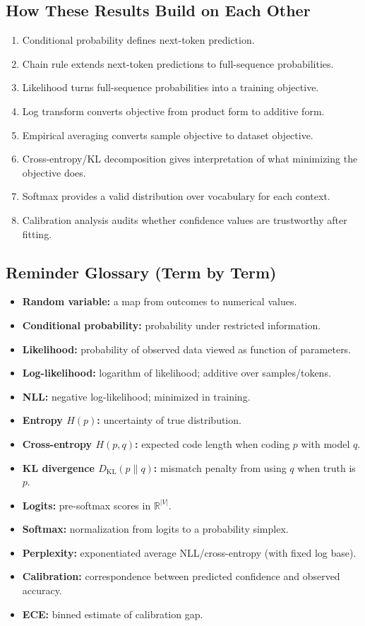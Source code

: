 \subsection*{How These Results Build on Each Other}
\begin{enumerate}[leftmargin=1.5em]
  \item Conditional probability defines next-token prediction.
  \item Chain rule extends next-token predictions to full-sequence probabilities.
  \item Likelihood turns full-sequence probabilities into a training objective.
  \item Log transform converts objective from product form to additive form.
  \item Empirical averaging converts sample objective to dataset objective.
  \item Cross-entropy/KL decomposition gives interpretation of what minimizing the objective does.
  \item Softmax provides a valid distribution over vocabulary for each context.
  \item Calibration analysis audits whether confidence values are trustworthy after fitting.
\end{enumerate}

\subsection*{Reminder Glossary (Term by Term)}
\begin{itemize}[leftmargin=1.5em]
  \item \textbf{Random variable:} a map from outcomes to numerical values.
  \item \textbf{Conditional probability:} probability under restricted information.
  \item \textbf{Likelihood:} probability of observed data viewed as function of parameters.
  \item \textbf{Log-likelihood:} logarithm of likelihood; additive over samples/tokens.
  \item \textbf{NLL:} negative log-likelihood; minimized in training.
  \item \textbf{Entropy $H(p)$:} uncertainty of true distribution.
  \item \textbf{Cross-entropy $H(p,q)$:} expected code length when coding $p$ with model $q$.
  \item \textbf{KL divergence $D_{\mathrm{KL}}(p\|q)$:} mismatch penalty from using $q$ when truth is $p$.
  \item \textbf{Logits:} pre-softmax scores in $\mathbb{R}^{|V|}$.
  \item \textbf{Softmax:} normalization from logits to a probability simplex.
  \item \textbf{Perplexity:} exponentiated average NLL/cross-entropy (with fixed log base).
  \item \textbf{Calibration:} correspondence between predicted confidence and observed accuracy.
  \item \textbf{ECE:} binned estimate of calibration gap.
\end{itemize}

